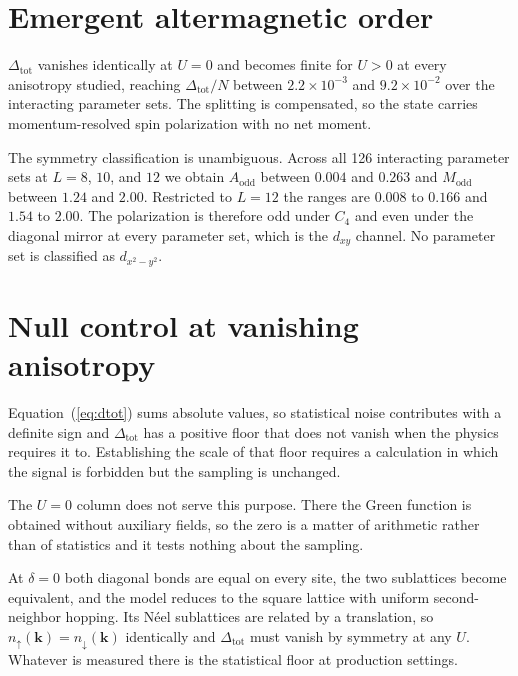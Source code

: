 \documentclass[aps,prl,reprint,superscriptaddress,amsmath,amssymb,floatfix]{revtex4-2}
\begin{document}
\section{Emergent altermagnetic order}

$\Delta_{\mathrm{tot}}$ vanishes identically at $U = 0$ and becomes finite for
$U > 0$ at every anisotropy studied, reaching $\Delta_{\mathrm{tot}}/N$ between
$2.2\times10^{-3}$ and $9.2\times10^{-2}$ over the interacting parameter sets.
The splitting is compensated, so the state carries momentum-resolved spin
polarization with no net moment.

The symmetry classification is unambiguous. Across all 126 interacting parameter
sets at $L = 8$, $10$, and $12$ we obtain $A_{\mathrm{odd}}$ between $0.004$ and
$0.263$ and $M_{\mathrm{odd}}$ between $1.24$ and $2.00$.
Restricted to $L = 12$ the ranges are $0.008$ to $0.166$ and $1.54$ to $2.00$.
The polarization is therefore odd under $C_4$ and even under the diagonal
mirror at every parameter set, which is the $d_{xy}$ channel. No parameter set
is classified as $d_{x^2-y^2}$.

\section{Null control at vanishing anisotropy}

Equation~(\ref{eq:dtot}) sums absolute values, so statistical noise contributes
with a definite sign and $\Delta_{\mathrm{tot}}$ has a positive floor that does
not vanish when the physics requires it to. Establishing the scale of that floor
requires a calculation in which the signal is forbidden but the sampling is
unchanged.

The $U = 0$ column does not serve this purpose. There the Green function is
obtained without auxiliary fields, so the zero is a matter of arithmetic rather
than of statistics and it tests nothing about the sampling.

At $\delta = 0$ both diagonal bonds are equal on every site, the two sublattices
become equivalent, and the model reduces to the square lattice with uniform
second-neighbor hopping. Its N\'eel sublattices are related by a translation, so
$n_{\uparrow}(\bm{k}) = n_{\downarrow}(\bm{k})$ identically and
$\Delta_{\mathrm{tot}}$ must vanish by symmetry at any $U$. Whatever is measured
there is the statistical floor at production settings.
\end{document}
